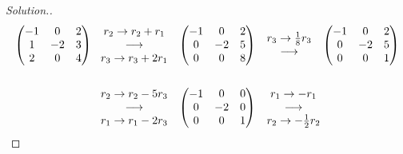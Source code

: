 \documentclass[11pt,a4paper]{article}
\theoremstyle{definition}
\newenvironment{solution}
  {\renewcommand{\qedsymbol}{}\begin{proof}[\textit{Solution}.]}
  {\end{proof}}
\begin{document}
\begin{solution}
\begin{align*}
\begin{pmatrix}
-1&0&2\\1&-2&3\\2&0&4\\
\end{pmatrix}
&\hspace{0.3cm}
\begin{matrix}
r_2\rightarrow r_2+r_1\\ \longrightarrow\\ r_3\rightarrow r_3+2r_1\\
\end{matrix}
\hspace{0.3cm}
\begin{pmatrix}
-1&0&2\\0&-2&5\\0&0&8\\
\end{pmatrix}
\hspace{0.3cm}
\begin{matrix}
r_3\rightarrow \frac{1}{8}r_3\\ \longrightarrow\\
\end{matrix}
\hspace{0.3cm}
\begin{pmatrix}
-1&0&2\\0&-2&5\\0&0&1\\
\end{pmatrix}\\\\
&\hspace{0.3cm}
\begin{matrix}
r_2\rightarrow r_2-5r_3\\ \longrightarrow\\ r_1\rightarrow r_1-2r_3\\
\end{matrix}
\hspace{0.3cm}
\begin{pmatrix}
-1&0&0\\0&-2&0\\0&0&1\\
\end{pmatrix}
\hspace{0.3cm}
\begin{matrix}
r_1\rightarrow -r_1\\ \longrightarrow\\ r_2\rightarrow -\frac{1}{2}r_2\\

\end{matrix}
\end{align*}
\end{solution}
\end{document}
